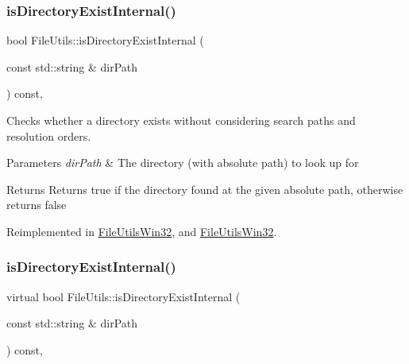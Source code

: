 \subsubsection{\texorpdfstring{is\+Directory\+Exist\+Internal()}{isDirectoryExistInternal()}\hspace{0.1cm}{\footnotesize\ttfamily [1/2]}}
{\footnotesize\ttfamily bool File\+Utils\+::is\+Directory\+Exist\+Internal (\begin{DoxyParamCaption}\item[{const std\+::string \&}]{dir\+Path }\end{DoxyParamCaption}) const\hspace{0.3cm}{\ttfamily [protected]}, {\ttfamily [virtual]}}

Checks whether a directory exists without considering search paths and resolution orders. 
\begin{DoxyParams}{Parameters}
{\em dir\+Path} & The directory (with absolute path) to look up for \\
\hline
\end{DoxyParams}
\begin{DoxyReturn}{Returns}
Returns true if the directory found at the given absolute path, otherwise returns false 
\end{DoxyReturn}


Reimplemented in \hyperlink{classFileUtilsWin32_aaeab26cde3a9a4cf3e4f8367d20f0e08}{File\+Utils\+Win32}, and \hyperlink{classFileUtilsWin32_a9a408c75230da1289e5619285dd00f67}{File\+Utils\+Win32}.

\mbox{\label{classFileUtils_a4fff89e80712f3767f423fe31d78fcaa}} 
\subsubsection{\texorpdfstring{is\+Directory\+Exist\+Internal()}{isDirectoryExistInternal()}\hspace{0.1cm}{\footnotesize\ttfamily [2/2]}}
{\footnotesize\ttfamily virtual bool File\+Utils\+::is\+Directory\+Exist\+Internal (\begin{DoxyParamCaption}\item[{const std\+::string \&}]{dir\+Path }\end{DoxyParamCaption}) const\hspace{0.3cm}{\ttfamily [protected]}, {\ttfamily [virtual]}}

